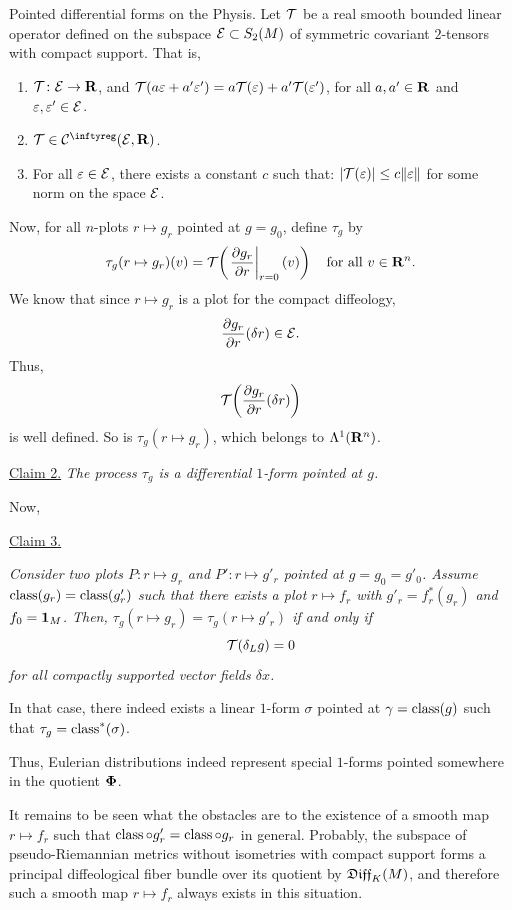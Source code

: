 \begin{Article}{Pointed differential forms on the Physis.}{}
  Let $\mathcal{T}$ be a real smooth bounded linear operator defined on the subspace $\mathcal{E} \subset S_2(M)$ of symmetric covariant $2$-tensors with compact support.
  That is,
  
  \begin{enumerate}
    \item $\mathcal{T} \colon \mathcal{E} \to \mathbf{R}$,
    and $\mathcal{T}(a \varepsilon + a'\varepsilon') = a \mathcal{T}(\varepsilon) + a'\mathcal{T}(\varepsilon')$,
    for all $a, a' \in \mathbf{R}$ and $\varepsilon, \varepsilon' \in \mathcal{E}$.
    \item $\cT \in \Cinfty(\cE, \RR)$.
    \item For all $\varepsilon \in \mathcal{E}$,
    there exists a constant $c$ such that:
    $|\mathcal{T}(\varepsilon)| \leq c \|\varepsilon\|$ for some norm on the space $\mathcal{E}$.
  \end{enumerate}
  
  Now,
  for all $n$-plots $r \mapsto g_r$ pointed at $g = g_0$,
  define $\tau_g$ by
  $$
    \tau_g(r\mapsto g_r)(v) = \mathcal{T}\!\left(\left.{\partial g_r \over \partial r}\right|_{r=0}(v)\right)
    \quad \text{for all } v \in \mathbf{R}^n.
  $$
  We know that since $r \mapsto g_r$ is a plot for the compact diffeology,
  $$
    {\partial g_r \over \partial r}(\delta r) \in \mathcal{E}.
  $$
  Thus,
  $$
    \mathcal{T}\!\left({\partial g_r \over \partial r}(\delta r)\right)
  $$
  is well defined.
  So is $\tau_g(r\mapsto g_r)$,
  which belongs to $\Lambda^1(\mathbf{R}^n)$.
  
  \uline{Claim 2.} {\itshape The process $\tau_g$ is a differential $1$-form pointed at $g$.}
  
  Now,
  
  \uline{Claim 3.} {\itshape Consider two plots $P \colon r \mapsto g_r$ and $P' \colon r \mapsto g'_r$ pointed at $g = g_0 = g'_0$.
  Assume $\operatorname{class}(g_r) = \operatorname{class}(g'_r)$ such that there exists a plot $r \mapsto f_r$ with $g'_r = f_r^*(g_r)$ and $f_0 = {\mathbf{1}}_M$.
  Then,
  $\tau_g(r\mapsto g_r) = \tau_g(r\mapsto g'_r)$ if and only if
  $$
    \mathcal{T}(\delta_L g) = 0
  $$
  for all compactly supported vector fields $\delta x$.
  
  In that case,
  there indeed exists a linear $1$-form $\sigma$ pointed at $\gamma = \operatorname{class}(g)$ such that $\tau_g = \operatorname{class}^*(\sigma)$.}
  
  Thus,
  Eulerian distributions indeed represent special $1$-forms pointed somewhere in the quotient ${\mbox{\boldmath $\Phi$}}$.
  
  \Note It remains to be seen what the obstacles are to the existence of a smooth map $r \mapsto f_r$ such that $\operatorname{class} \circ g'_r = \operatorname{class} \circ g_r$ in general.
  Probably,
  the subspace of pseudo-Riemannian metrics without isometries with compact support forms a principal diffeological fiber bundle over its quotient by $\mathfrak{Diff}_K(M)$,
  and therefore such a smooth map $r \mapsto f_r$ always exists in this situation.
\end{Article}

